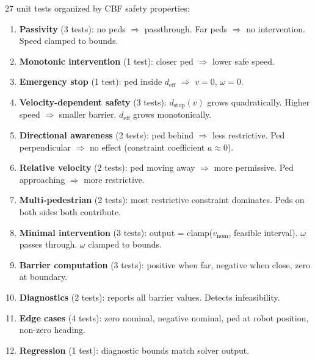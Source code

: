 \documentclass[11pt]{article}
\begin{document}
27 unit tests organized by CBF safety properties:
\begin{enumerate}
  \item \textbf{Passivity} (3 tests): no peds $\Rightarrow$ passthrough. Far peds $\Rightarrow$ no intervention. Speed clamped to bounds.
  \item \textbf{Monotonic intervention} (1 test): closer ped $\Rightarrow$ lower safe speed.
  \item \textbf{Emergency stop} (1 test): ped inside $d_{\text{eff}}$ $\Rightarrow$ $v=0$, $\omega=0$.
  \item \textbf{Velocity-dependent safety} (3 tests): $d_{\text{stop}}(v)$ grows quadratically. Higher speed $\Rightarrow$ smaller barrier. $d_{\text{eff}}$ grows monotonically.
  \item \textbf{Directional awareness} (2 tests): ped behind $\Rightarrow$ less restrictive. Ped perpendicular $\Rightarrow$ no effect (constraint coefficient $a \approx 0$).
  \item \textbf{Relative velocity} (2 tests): ped moving away $\Rightarrow$ more permissive. Ped approaching $\Rightarrow$ more restrictive.
  \item \textbf{Multi-pedestrian} (2 tests): most restrictive constraint dominates. Peds on both sides both contribute.
  \item \textbf{Minimal intervention} (3 tests): output = clamp($v_{\text{nom}}$, feasible interval). $\omega$ passes through. $\omega$ clamped to bounds.
  \item \textbf{Barrier computation} (3 tests): positive when far, negative when close, zero at boundary.
  \item \textbf{Diagnostics} (2 tests): reports all barrier values. Detects infeasibility.
  \item \textbf{Edge cases} (4 tests): zero nominal, negative nominal, ped at robot position, non-zero heading.
  \item \textbf{Regression} (1 test): diagnostic bounds match solver output.
\end{enumerate}
\end{document}
